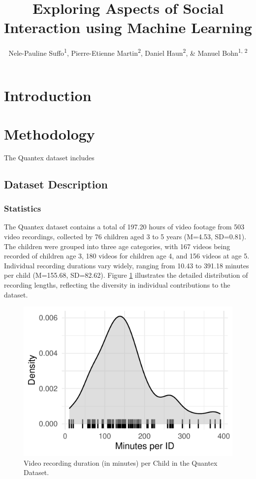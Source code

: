 \documentclass[
  man,floatsintext]{apa6}
\title{Exploring Aspects of Social Interaction using Machine Learning}
\author{Nele-Pauline Suffo\textsuperscript{1}, Pierre-Etienne Martin\textsuperscript{2}, Daniel Haun\textsuperscript{2}, \& Manuel Bohn\textsuperscript{1, 2}}
\date{}
\affiliation{\vspace{0.5cm}\textsuperscript{1} Institute of Psychology in Education, Leuphana University Lüneburg\\\textsuperscript{2} Max Planck Institute for Evolutionary Anthropology}
\begin{document}
\maketitle

\section{Introduction}\label{introduction}

\section{Methodology}\label{methodology}

The Quantex dataset includes

\subsection{Dataset Description}\label{dataset-description}

\subsubsection{Statistics}\label{statistics}

The Quantex dataset contains a total of 197.20 hours of video footage from 503 video recordings, collected by 76 children aged 3 to 5 years (M=4.53, SD=0.81). The children were grouped into three age categories, with 167 videos being recorded of children age 3, 180 videos for children age 4, and 156 videos at age 5. Individual recording durations vary widely, ranging from 10.43 to 391.18 minutes per child (M=155.68, SD=82.62). Figure \ref{fig:quantex-minutes-per-child} illustrates the detailed distribution of recording lengths, reflecting the diversity in individual contributions to the dataset.

\begin{figure}

{\centering \includegraphics{Quantex_interaction_paper_files/figure-latex/quantex-minutes-per-child-1} 

}

\caption{Video recording duration (in minutes) per Child in the Quantex Dataset.}\label{fig:quantex-minutes-per-child}
\end{figure}
\end{document}
